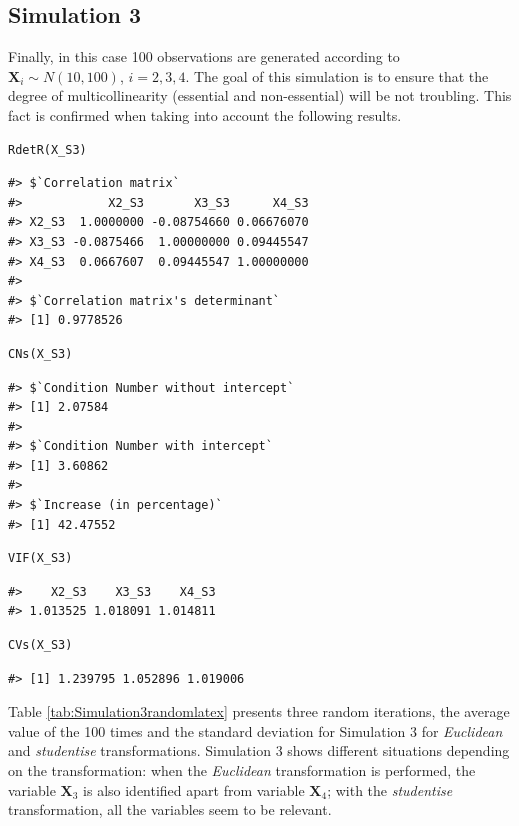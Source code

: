 \hypertarget{simulation-3}{%
\subsection{Simulation 3}\label{simulation-3}}

Finally, in this case 100 observations are generated according to \(\mathbf{X}_{i} \sim N(10, 100)\), \(i=2,3,4\). The goal of this simulation is to ensure that the degree of multicollinearity (essential and non-essential) will be not troubling. This fact is confirmed when taking into account the following results.

\begin{verbatim}
RdetR(X_S3)
\end{verbatim}

\begin{verbatim}
#> $`Correlation matrix`
#>            X2_S3       X3_S3      X4_S3
#> X2_S3  1.0000000 -0.08754660 0.06676070
#> X3_S3 -0.0875466  1.00000000 0.09445547
#> X4_S3  0.0667607  0.09445547 1.00000000
#> 
#> $`Correlation matrix's determinant`
#> [1] 0.9778526
\end{verbatim}

\begin{verbatim}
CNs(X_S3)
\end{verbatim}

\begin{verbatim}
#> $`Condition Number without intercept`
#> [1] 2.07584
#> 
#> $`Condition Number with intercept`
#> [1] 3.60862
#> 
#> $`Increase (in percentage)`
#> [1] 42.47552
\end{verbatim}

\begin{verbatim}
VIF(X_S3)
\end{verbatim}

\begin{verbatim}
#>    X2_S3    X3_S3    X4_S3 
#> 1.013525 1.018091 1.014811
\end{verbatim}

\begin{verbatim}
CVs(X_S3)
\end{verbatim}

\begin{verbatim}
#> [1] 1.239795 1.052896 1.019006
\end{verbatim}

Table \ref{tab:Simulation3randomlatex} presents three random iterations, the average value of the 100 times and the standard deviation for Simulation 3 for \emph{Euclidean} and \emph{studentise} transformations. Simulation 3 shows different situations depending on the transformation: when the \emph{Euclidean} transformation is performed, the variable \(\mathbf{X}_{3}\) is also identified apart from variable \(\mathbf{X}_{4}\); with the \emph{studentise} transformation, all the variables seem to be relevant.

